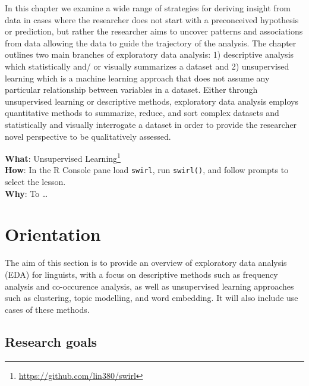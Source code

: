 \documentclass[
  letterpaper,
]{scrbook}
\DeclareRobustCommand{\href}[2]{#2\footnote{\url{#1}}}
\begin{document}
In this chapter we examine a wide range of strategies for deriving
insight from data in cases where the researcher does not start with a
preconceived hypothesis or prediction, but rather the researcher aims to
uncover patterns and associations from data allowing the data to guide
the trajectory of the analysis. The chapter outlines two main branches
of exploratory data analysis: 1) descriptive analysis which
statistically and/ or visually summarizes a dataset and 2) unsupervised
learning which is a machine learning approach that does not assume any
particular relationship between variables in a dataset. Either through
unsupervised learning or descriptive methods, exploratory data analysis
employs quantitative methods to summarize, reduce, and sort complex
datasets and statistically and visually interrogate a dataset in order
to provide the researcher novel perspective to be qualitatively
assessed.

\begin{tcolorbox}[enhanced jigsaw, title=\textcolor{quarto-callout-tip-color}{\faLightbulb}\hspace{0.5em}{Swirl}, titlerule=0mm, toptitle=1mm, colbacktitle=quarto-callout-tip-color!10!white, bottomtitle=1mm, left=2mm, colframe=quarto-callout-tip-color-frame, breakable, toprule=.15mm, colback=white, opacitybacktitle=0.6, leftrule=.75mm, rightrule=.15mm, bottomrule=.15mm, arc=.35mm, coltitle=black, opacityback=0]

\textbf{What}: \href{https://github.com/lin380/swirl}{Unsupervised
Learning}\\
\textbf{How}: In the R Console pane load \texttt{swirl}, run
\texttt{swirl()}, and follow prompts to select the lesson.\\
\textbf{Why}: To \ldots{}

\end{tcolorbox}

\hypertarget{eda-orientation}{%
\section{Orientation}\label{eda-orientation}}

The aim of this section is to provide an overview of exploratory data
analysis (EDA) for linguists, with a focus on descriptive methods such
as frequency analysis and co-occurence analysis, as well as unsupervised
learning approaches such as clustering, topic modelling, and word
embedding. It will also include use cases of these methods.

\hypertarget{eda-research-goals}{%
\subsection{Research goals}\label{eda-research-goals}}
\end{document}
